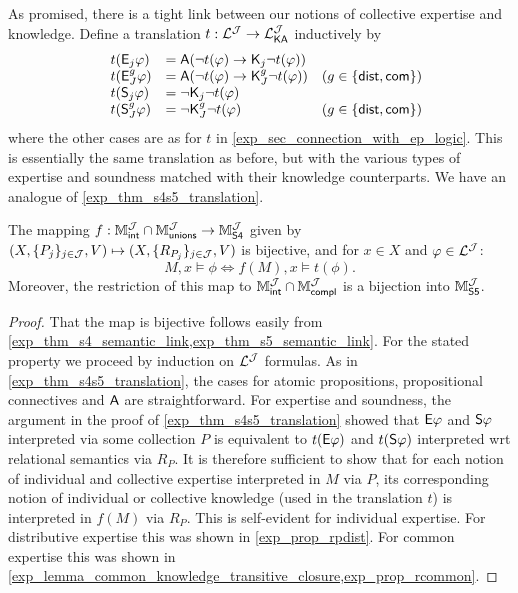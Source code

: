 As promised, there is a tight link between our notions of collective
expertise and knowledge. Define a translation $t: \cLJ \to
\cLKAJ$ inductively by
\[
\begin{array}{lllr}
 &t(\E_j\phi) &= \A(\neg t(\phi) \limplies \K_j\neg t(\phi)) \\
 &t(\E_J^g\phi) &= \A(\neg t(\phi) \limplies \K_J^g\neg t(\phi))
     &(g \in \{\dist, \common\}) \\
 &t(\S_j\phi) &= \neg\K_j\neg t(\phi) \\
 &t(\S_J^g\phi) &= \neg\K_J^g\neg t(\phi)
     &(g \in \{\dist, \common\}) \\
\end{array}\]
where the other cases are as for $t$ in \cref{exp_sec_connection_with_ep_logic}.
This is essentially the same translation as before, but with the various
types of expertise and soundness matched with their knowledge counterparts. We
have an analogue of \cref{exp_thm_s4s5_translation}.

\begin{theorem}
\label{exp_thm_collective_s4s5_translation}
The mapping $f: \MintJ \cap \MunionsJ \to \MsfourJ$ given by
$(X, \{P_j\}_{j \in \J}, V) \mapsto (X, \{R_{P_j}\}_{j \in \J}, V)$ is
bijective, and for $x \in X$ and $\phi \in \cLJ$:
\[
M, x \models \phi \iff f(M), x \models t(\phi).\]
Moreover, the restriction of this map to $\MintJ \cap \McomplJ$ is a
bijection into $\MsfiveJ$.
\end{theorem}

\begin{proof}
That the map is bijective follows easily from
\cref{exp_thm_s4_semantic_link,exp_thm_s5_semantic_link}. For
the stated property we proceed by induction on $\cLJ$ formulas. As in
\cref{exp_thm_s4s5_translation}, the cases for atomic propositions,
propositional connectives and $\A$ are straightforward.
%
For expertise and soundness, the argument in the proof of
\cref{exp_thm_s4s5_translation} showed that $\E\phi$ and
$\S\phi$ interpreted via some collection $P$ is
equivalent to $t(\E\phi)$ and $t(\S\phi)$ interpreted wrt
relational semantics via $R_P$.
%
It is therefore sufficient to show that for each notion of individual and
collective expertise interpreted in $M$ via $P$, its
corresponding notion of individual or collective knowledge (used in the
translation $t$) is interpreted in $f(M)$ via $R_P$.
This is self-evident for individual expertise. For distributive expertise
this was shown in \cref{exp_prop_rpdist}. For common expertise this was
shown in \cref{exp_lemma_common_knowledge_transitive_closure,exp_prop_rcommon}.
\end{proof}


